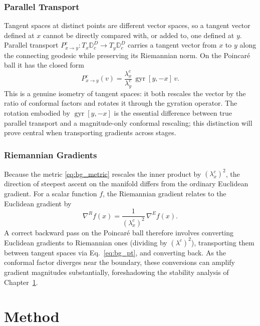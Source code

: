 \documentclass[12pt]{report}
\begin{document}
\subsection{Parallel Transport}
Tangent spaces at distinct points are different vector spaces, so a tangent vector defined at $x$ cannot be directly compared with, or added to, one defined at $y$. Parallel transport $P_{x \to y}^c : T_x\mathbb{D}_c^D \to T_y\mathbb{D}_c^D$ carries a tangent vector from $x$ to $y$ along the connecting geodesic while preserving its Riemannian norm. On the Poincar\'e ball it has the closed form
\begin{equation}
    \label{eq:bg_pt}
    P_{x \to y}^c(v) = \frac{\lambda_x^c}{\lambda_y^c}\,\operatorname{gyr}[y, -x]\,v.
\end{equation}
This is a genuine isometry of tangent spaces: it both rescales the vector by the ratio of conformal factors and rotates it through the gyration operator. The rotation embodied by $\operatorname{gyr}[y, -x]$ is the essential difference between true parallel transport and a magnitude-only conformal rescaling; this distinction will prove central when transporting gradients across stages.

\subsection{Riemannian Gradients}
Because the metric \ref{eq:bg_metric} rescales the inner product by $(\lambda_x^c)^2$, the direction of steepest ascent on the manifold differs from the ordinary Euclidean gradient. For a scalar function $f$, the Riemannian gradient relates to the Euclidean gradient by
\begin{equation}
    \label{eq:bg_riemgrad}
    \nabla^R f(x) = \frac{1}{(\lambda_x^c)^2}\,\nabla^E f(x).
\end{equation}
A correct backward pass on the Poincar\'e ball therefore involves converting Euclidean gradients to Riemannian ones (dividing by $(\lambda^c)^2$), transporting them between tangent spaces via Eq.~\ref{eq:bg_pt}, and converting back. As the conformal factor diverges near the boundary, these conversions can amplify gradient magnitudes substantially, foreshadowing the stability analysis of Chapter~\ref{chap:methods}.


\chapter{Method}
\label{chap:methods}
\end{document}
